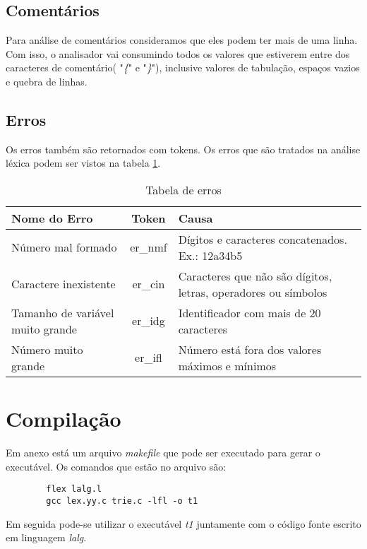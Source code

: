\documentclass {article}
\begin{document}
	\subsection{Comentários}
		Para análise de comentários consideramos que eles podem ter mais de uma linha. Com isso, o analisador vai consumindo todos os valores que estiverem entre dos caracteres de comentário( "\emph{\{}" e "\emph{\}}"), inclusive valores de tabulação, espaços vazios e quebra de linhas.
		
	\subsection{Erros}
		Os erros também são retornados com tokens. Os erros que são tratados na análise léxica podem ser vistos na tabela \ref{tb_er}.
		
		\begin{table}[ht]
		\begin{center}
		\begin{tabular}{p{5cm}cp{5cm}}
			\toprule
			Nome do Erro & Token & Causa\\
			\hline
			\hline
				Número mal formado & er\_nmf & Dígitos e caracteres concatenados. Ex.: 12a34b5\\
				Caractere inexistente & er\_cin & Caracteres que não são dígitos, letras, operadores ou símbolos\\
				Tamanho de variável muito grande & er\_idg & Identificador com mais de 20 caracteres\\
				Número muito grande & er\_ifl & Número está fora dos valores máximos e mínimos\\
			\bottomrule
		\end{tabular}
		\caption{Tabela de erros}
		\label{tb_er}
		\end{center}
		\end{table}
	

\section{Compilação}
	
	Em anexo está um arquivo \emph{makefile} que pode ser executado para gerar o executável. Os comandos que estão no arquivo são:
	
	\begin{verbatim}
        flex lalg.l
        gcc lex.yy.c trie.c -lfl -o t1
	\end{verbatim}
	
	Em seguida pode-se utilizar o executável \emph{t1} juntamente com o código fonte escrito em linguagem \emph{lalg}.
	
\end{document}
